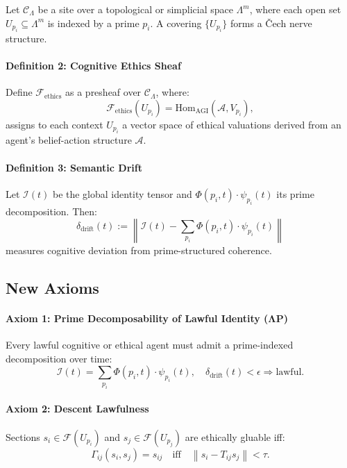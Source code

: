 \documentclass{article}
\theoremstyle{plain}
\begin{document}
Let $\mathcal{C}_\Lambda$ be a site over a topological or simplicial space $\Lambda^m$, where each open set $U_{p_i} \subseteq \Lambda^m$ is indexed by a prime $p_i$. A covering $\{ U_{p_i} \}$ forms a Čech nerve structure.

\paragraph{Definition 2: Cognitive Ethics Sheaf}

Define $\mathcal{F}_{\text{ethics}}$ as a presheaf over $\mathcal{C}_\Lambda$, where:
\[
\mathcal{F}_{\text{ethics}}(U_{p_i}) = \text{Hom}_{\text{AGI}}(\mathcal{A}, V_{p_i}),
\]
assigns to each context $U_{p_i}$ a vector space of ethical valuations derived from an agent's belief-action structure $\mathcal{A}$.

\paragraph{Definition 3: Semantic Drift}

Let $\mathcal{I}(t)$ be the global identity tensor and $\Phi(p_i,t) \cdot \psi_{p_i}(t)$ its prime decomposition. Then:
\[
\delta_{\text{drift}}(t) := \left\| \mathcal{I}(t) - \sum_{p_i} \Phi(p_i,t) \cdot \psi_{p_i}(t) \right\|
\]
measures cognitive deviation from prime-structured coherence.

\subsection{New Axioms}

\paragraph{Axiom 1: Prime Decomposability of Lawful Identity (ΛP)}

Every lawful cognitive or ethical agent must admit a prime-indexed decomposition over time:
\[
\mathcal{I}(t) = \sum_{p_i} \Phi(p_i,t) \cdot \psi_{p_i}(t), \quad \delta_{\text{drift}}(t) < \epsilon \Rightarrow \text{lawful}.
\]

\paragraph{Axiom 2: Descent Lawfulness}

Sections $s_i \in \mathcal{F}(U_{p_i})$ and $s_j \in \mathcal{F}(U_{p_j})$ are ethically gluable iff:
\[
\Gamma_{ij}(s_i, s_j) = s_{ij} \quad \text{iff} \quad \left\|s_i - T_{ij}s_j\right\| < \tau.
\]
\end{document}
